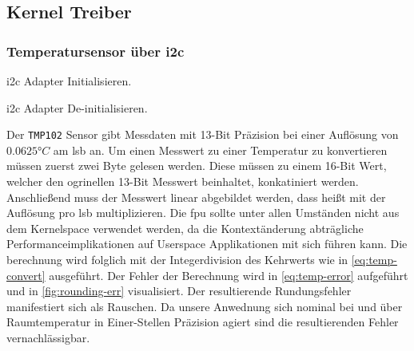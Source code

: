 \subsection{Kernel Treiber}


\subsubsection{Temperatursensor über \acrshort{i2c}}

\Gls{i2c} Adapter Initialisieren.


\Gls{i2c} Adapter De-initialisieren.


Der \texttt{TMP102} Sensor gibt Messdaten mit 13-Bit Präzision bei einer Auflösung von $0.0625\si{\degree C}$ am \gls{lsb} an.
Um einen Messwert zu einer Temperatur zu konvertieren müssen zuerst zwei Byte gelesen werden.
Diese müssen zu einem 16-Bit Wert, welcher den ogrinellen 13-Bit Messwert beinhaltet, konkatiniert werden.
Anschlie{\ss}end muss der Messwert linear abgebildet werden, dass hei{\ss}t mit der Auflösung pro \gls{lsb} multiplizieren.
Die \gls{fpu} sollte unter allen Umständen nicht aus dem Kernelspace verwendet werden,
da die Kontextänderung abträgliche Performanceimplikationen auf Userspace Applikationen mit sich führen kann.
Die berechnung wird folglich mit der Integerdivision des Kehrwerts wie in \autoref{eq:temp-convert} ausgeführt.
Der Fehler der Berechnung wird in \autoref{eq:temp-error} aufgeführt und in \autoref{fig:rounding-err} visualisiert.
Der resultierende Rundungsfehler manifestiert sich als Rauschen.
Da unsere Anwednung sich nominal bei und über Raumtemperatur in Einer-Stellen Präzision agiert sind die resultierenden Fehler vernachlässigbar.

